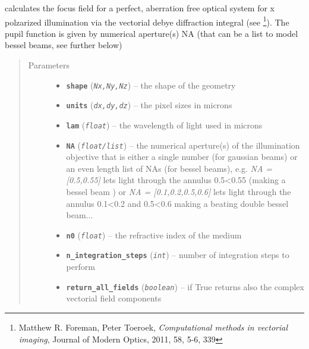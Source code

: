 \documentclass[a4paper,10pt,english]{sphinxmanual}
\begin{document}
\begin{fulllineitems}
\label{beams:biobeam.focus_field_beam}
calculates the focus field for a perfect, aberration free optical system for
x polzarized illumination via the vectorial debye diffraction integral (see \footnote[1]{
Matthew R. Foreman, Peter Toeroek, \emph{Computational methods in vectorial imaging}, Journal of Modern Optics, 2011, 58, 5-6, 339
}).
The pupil function is given by numerical aperture(s) NA (that can be a list to
model bessel beams, see further below)
\begin{quote}\begin{description}
\item[{Parameters}] \leavevmode\begin{itemize}
\item {} 
\textbf{\texttt{shape}} (\emph{\texttt{Nx,Ny,Nz}}) -- the shape of the geometry

\item {} 
\textbf{\texttt{units}} (\emph{\texttt{dx,dy,dz}}) -- the pixel sizes in microns

\item {} 
\textbf{\texttt{lam}} (\emph{\texttt{float}}) -- the wavelength of light used in microns

\item {} 
\textbf{\texttt{NA}} (\emph{\texttt{float/list}}) -- the numerical aperture(s) of the illumination objective
that is either a single number (for gaussian beams) or an
even length list of NAs (for bessel beams), e.g.
\emph{NA = {[}0.5,0.55{]}} lets light through the annulus 0.5\textless{}0.55 (making a bessel beam ) or
\emph{NA = {[}0.1,0.2,0.5,0.6{]}} lets light through the annulus 0.1\textless{}0.2 and 0.5\textless{}0.6 making a
beating double bessel beam...

\item {} 
\textbf{\texttt{n0}} (\emph{\texttt{float}}) -- the refractive index of the medium

\item {} 
\textbf{\texttt{n\_integration\_steps}} (\emph{\texttt{int}}) -- number of integration steps to perform

\item {} 
\textbf{\texttt{return\_all\_fields}} (\emph{\texttt{boolean}}) -- if True returns also the complex vectorial field components


\end{itemize}
\end{description}
\end{quote}
\end{fulllineitems}
\end{document}

